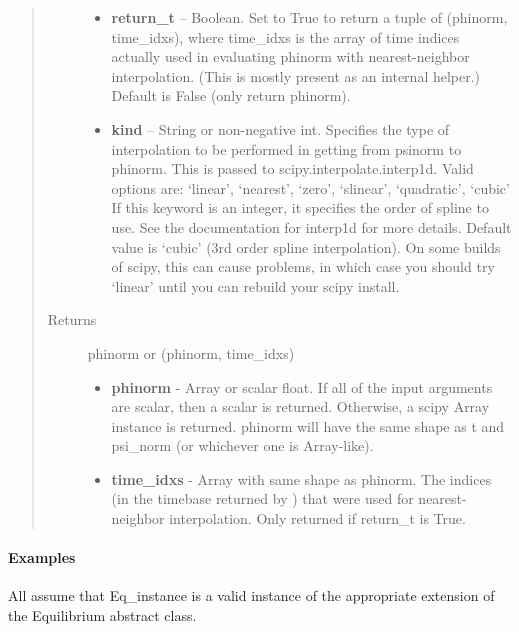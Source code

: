 \documentclass[letterpaper,10pt,english]{sphinxmanual}
\begin{document}
\begin{fulllineitems}
\begin{fulllineitems}
\begin{quote}
\begin{description}
\begin{itemize}
\item {} 
\textbf{return\_t} --
Boolean.
Set to True to return a tuple of (phinorm,
time\_idxs), where time\_idxs is the array of time indices
actually used in evaluating phinorm with nearest-neighbor
interpolation. (This is mostly present as an internal helper.)
Default is False (only return phinorm).

\item {} 
\textbf{kind} --
String or non-negative int.
Specifies the type of interpolation
to be performed in getting from psinorm to phinorm. This is
passed to scipy.interpolate.interp1d. Valid options are:
`linear', `nearest', `zero', `slinear', `quadratic', `cubic'
If this keyword is an integer, it specifies the order of spline
to use. See the documentation for interp1d for more details.
Default value is `cubic' (3rd order spline interpolation). On
some builds of scipy, this can cause problems, in which case
you should try `linear' until you can rebuild your scipy install.

\end{itemize}

\item[{Returns}] \leavevmode

phinorm or (phinorm, time\_idxs)
\begin{itemize}
\item {} 
\textbf{phinorm} - Array or scalar float. If all of the input arguments are
scalar, then a scalar is returned. Otherwise, a scipy Array
instance is returned. phinorm will have the same shape as t and
psi\_norm (or whichever one is Array-like).

\item {} 
\textbf{time\_idxs} - Array with same shape as phinorm. The indices (in
the timebase returned by {\hyperref[eqtools:eqtools.core.Equilibrium.getTimeBase]{}}) that were used
for nearest-neighbor interpolation. Only returned if return\_t is
True.

\end{itemize}


\end{description}\end{quote}
\paragraph{Examples}

All assume that Eq\_instance is a valid instance of the appropriate
extension of the Equilibrium abstract class.


\end{fulllineitems}
\end{fulllineitems}
\end{document}
